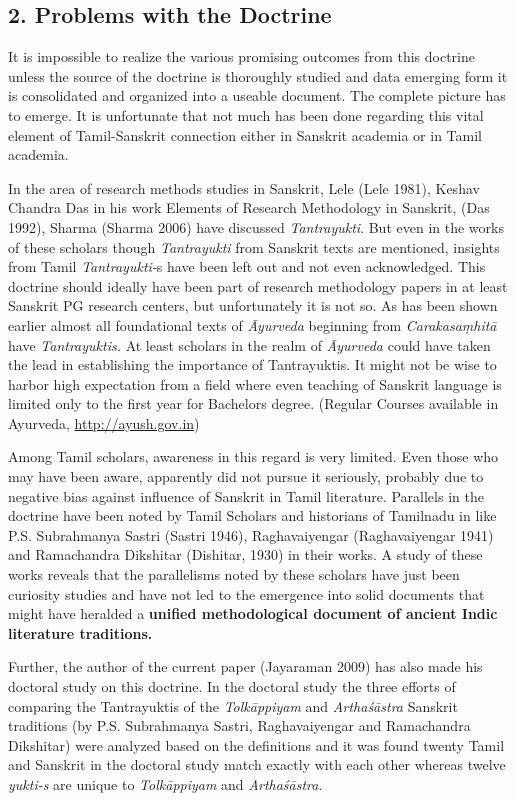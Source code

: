\subsection*{2. Problems with the Doctrine}

It is impossible to realize the various promising outcomes from this doctrine unless the source of the doctrine is thoroughly studied and data emerging form it is consolidated and organized into a useable document. The complete picture has to emerge. It is unfortunate that not much has been done regarding this vital element of Tamil-Sanskrit connection either in Sanskrit academia or in Tamil academia.

In the area of research methods studies in Sanskrit, Lele (Lele 1981), Keshav Chandra Das in his work Elements of Research Methodology in Sanskrit, (Das 1992), Sharma (Sharma 2006) have discussed \textit{Tantrayukti}. But even in the works of these scholars though \textit{Tantrayukti} from Sanskrit texts are mentioned, insights from Tamil \textit{Tantrayukti-}s have been left out and not even acknowledged. This doctrine should ideally have been part of research methodology papers in at least Sanskrit PG research centers, but unfortunately it is not so. As has been shown earlier almost all foundational texts of \textit{Āyurveda} beginning from \textit{Carakasaṃhitā} have \textit{Tantrayuktis.} At least scholars in the realm of \textit{Āyurveda} could have taken the lead in establishing the importance of Tantrayuktis. It might not be wise to harbor high expectation from a field where even teaching of Sanskrit language is limited only to the first year for Bachelors degree. (Regular Courses available in Ayurveda, \url{http://ayush.gov.in})

Among Tamil scholars, awareness in this regard is very limited. Even those who may have been aware, apparently did not pursue it seriously, probably due to negative bias against influence of Sanskrit in Tamil literature. Parallels in the doctrine have been noted by Tamil Scholars and historians of Tamilnadu in like P.S. Subrahmanya Sastri (Sastri 1946), Raghavaiyengar (Raghavaiyengar 1941) and Ramachandra Dikshitar (Dishitar, 1930) in their works. A study of these works reveals that the parallelisms noted by these scholars have just been curiosity studies and have not led to the emergence into solid documents that might have heralded a \textbf{unified methodological document of ancient Indic literature traditions.}

Further, the author of the current paper (Jayaraman 2009) has also made his doctoral study on this doctrine. In the doctoral study the three efforts of comparing the Tantrayuktis of the \textit{Tolkāppiyam} and \textit{Arthaśāstra} Sanskrit traditions (by P.S. Subrahmanya Sastri, Raghavaiyengar and Ramachandra Dikshitar) were analyzed based on the definitions and it was found twenty Tamil and Sanskrit in the doctoral study match exactly with each other whereas twelve \textit{yukti-s} are unique to \textit{Tolkāppiyam} and \textit{Arthaśāstra}.


